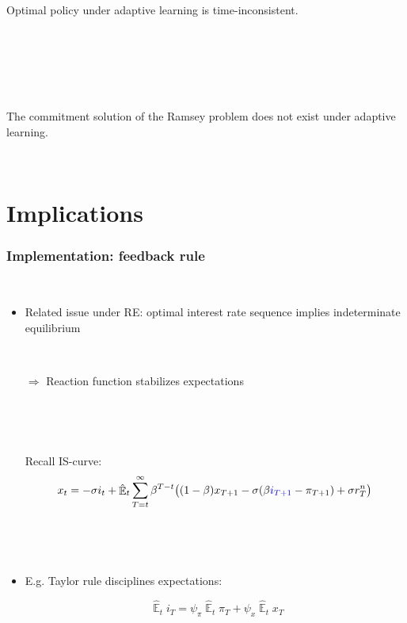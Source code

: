 \documentclass[11pt]{beamer}
\DeclareMathOperator{\E}{\mathbb{E}}
\begin{document}
\begin{frame}
	\frametitle{}
	\label{no_commitment}

\begin{corollary} Optimal policy under adaptive learning is time-inconsistent. 
\end{corollary}


\

\

\

\begin{lemma} The commitment solution of the Ramsey problem does not exist under adaptive learning. 
\end{lemma}


\

\vfill

\hfill \hyperlink{no_commitment_intuition}{}


\end{frame}





\section{Implications}


\begin{frame}
	\frametitle{Implementation: feedback rule}

\	
	\begin{itemize}
	\item Related issue under RE: optimal interest rate sequence implies indeterminate equilibrium
	
	\
	
	\item[$\Rightarrow$] Reaction function stabilizes expectations
	
	\
	
	\
	
	\item[] Recall IS-curve:
	\begin{equation*}
	x_t =  -\sigma i_t +\hat{\E}_t \sum_{T=t}^{\infty} \beta^{T-t }\big( (1-\beta)x_{T+1} - \sigma(\beta \textcolor{blue}{i_{T+1}} - \pi_{T+1}) +\sigma r_T^n \big) 
	\end{equation*}
	
	\
	
	\
	
	\item E.g. Taylor rule disciplines expectations:
	
	 $$\; \hat{\E}_t i_T = \psi_{\pi}\hat{\E}_t\pi_{T}+\psi_{x}\hat{\E}_tx_{T}$$
	\end{itemize}


\end{frame}
\end{document}
